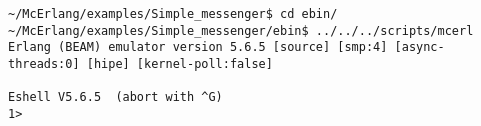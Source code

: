 \begin{verbatim}
~/McErlang/examples/Simple_messenger$ cd ebin/
~/McErlang/examples/Simple_messenger/ebin$ ../../../scripts/mcerl
Erlang (BEAM) emulator version 5.6.5 [source] [smp:4] [async-threads:0] [hipe] [kernel-poll:false]

Eshell V5.6.5  (abort with ^G)
1> 
\end{verbatim}
